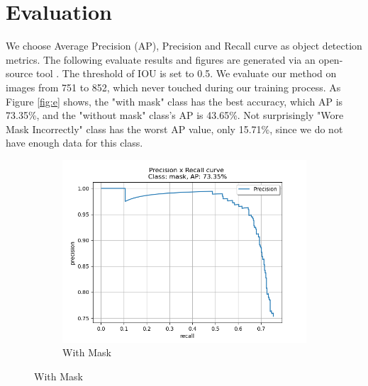 \documentclass[10pt,a4paper]{report}
\begin{document}
\chapter{Evaluation}
We choose Average Precision (AP), Precision and Recall curve as object detection metrics. The following evaluate results and figures are generated via an open-source tool \cite{odm}. The threshold of IOU is set to 0.5. We evaluate our method on images from 751 to 852, which never touched during our training process.
As Figure \ref{fig:e} shows, the "with mask" class has the best accuracy, which AP is 73.35\%, and the "without mask" class's AP is 43.65\%. Not surprisingly "Wore Mask Incorrectly" class has the worst AP value, only 15.71\%, since we do not have enough data for this class.
\begin{figure}[hbtp]
     \centering
     \begin{subfigure}[b]{0.8\textwidth}
         \centering
         \includegraphics[width=\textwidth]{./imgs/mask.png}
         \caption{With Mask}


\end{subfigure}
\end{figure}
\end{document}

